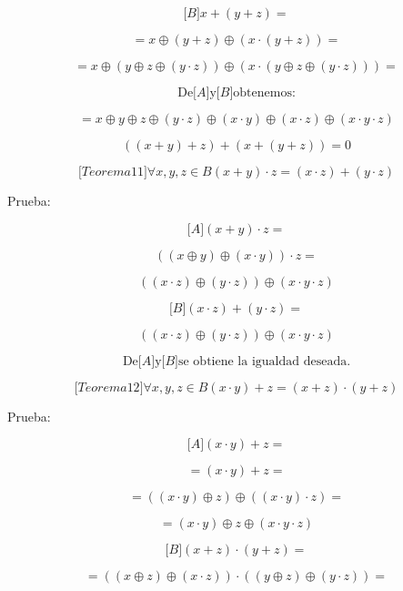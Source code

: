 \begin{enumerate}
\begin{enumerate}
\begin{enumerate}
      \[{\lbrack B\rbrack}{{x + {({y + z})}} =}\]

      \[{= x} \oplus {({y + z})} \oplus {{({x \cdot {({y + z})}})} =}\]

      \[{= x} \oplus {({y \oplus z \oplus {({y \cdot z})}})} \oplus {{({x \cdot {({y \oplus z \oplus {({y \cdot z})}})}})} =}\]

      \[\text{De}{\lbrack A\rbrack}\text{y}{\lbrack B\rbrack}\text{obtenemos:}\]

      \[{= x} \oplus y \oplus z \oplus {({y \cdot z})} \oplus {({x \cdot y})} \oplus {({x \cdot z})} \oplus {({{x \cdot y} \cdot z})}\]

      \[{\left( {{({x + y})} + z} \right) + \left( {x + {({y + z})}} \right)} = 0\]

      \[{\lbrack{{Teorema}11}\rbrack}\forall x,y,{z \in B}{{{({x + y})} \cdot z} = {{({x \cdot z})} + {({y \cdot z})}}}\]

      Prueba:

      \[{\lbrack A\rbrack}{{{({x + y})} \cdot z} =}\]

      \[{{({{({x \oplus y})} \oplus {({x \cdot y})}})} \cdot z} =\]

      \[{({{({x \cdot z})} \oplus {({y \cdot z})}})} \oplus {({{x \cdot y} \cdot z})}\]

      \[{\lbrack B\rbrack}{{{({x \cdot z})} + {({y \cdot z})}} =}\]

      \[{({{({x \cdot z})} \oplus {({y \cdot z})}})} \oplus {({{x \cdot y} \cdot z})}\]

      \[\text{De}{\lbrack A\rbrack}\text{y}{\lbrack B\rbrack}\text{se obtiene la igualdad deseada.}\]

      \[{\lbrack{{Teorema}12}\rbrack}\forall x,y,{z \in B}{{{({x \cdot y})} + z} = {{({x + z})} \cdot {({y + z})}}}\]

      Prueba:

      \[{\lbrack A\rbrack}{{{({x \cdot y})} + z} =}\]

      \[{= {{({x \cdot y})} + z}} =\]

      \[{= {({{({x \cdot y})} \oplus z})}} \oplus {{({{({x \cdot y})} \cdot z})} =}\]

      \[{= {({x \cdot y})}} \oplus z \oplus {({{x \cdot y} \cdot z})}\]

      \[{\lbrack B\rbrack}{{{({x + z})} \cdot {({y + z})}} =}\]

      \[{= {{({{({x \oplus z})} \oplus {({x \cdot z})}})} \cdot {({{({y \oplus z})} \oplus {({y \cdot z})}})}}} =\]


\end{enumerate}
\end{enumerate}
\end{enumerate}
